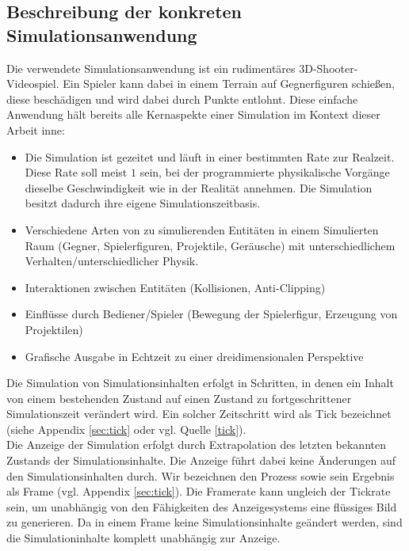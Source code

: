 \subsection{Beschreibung der konkreten Simulationsanwendung}
Die verwendete Simulationsanwendung ist ein rudimentäres 3D-Shooter-Videospiel. Ein Spieler kann dabei in einem Terrain auf Gegnerfiguren schießen, diese beschädigen und wird dabei durch Punkte entlohnt. Diese einfache Anwendung hält bereits alle Kernaspekte einer Simulation im Kontext dieser Arbeit inne:
\begin{itemize}
\item Die Simulation ist gezeitet und läuft in einer bestimmten Rate zur Realzeit. Diese Rate soll meist $1$ sein, bei der programmierte physikalische Vorgänge dieselbe Geschwindigkeit wie in der Realität annehmen. Die Simulation besitzt dadurch ihre eigene Simulationszeitbasis.
\item Verschiedene Arten von zu simulierenden Entitäten in einem Simulierten Raum (Gegner, Spielerfiguren, Projektile, Geräusche) mit unterschiedlichem Verhalten/unterschiedlicher Physik.
\item Interaktionen zwischen Entitäten (Kollisionen, Anti-Clipping)
\item Einflüsse durch Bediener/Spieler (Bewegung der Spielerfigur, Erzeugung von Projektilen)
\item Grafische Ausgabe in Echtzeit zu einer dreidimensionalen Perspektive
\end{itemize}

Die Simulation von Simulationsinhalten erfolgt in Schritten, in denen ein Inhalt von einem bestehenden Zustand auf einen Zustand zu fortgeschrittener Simulationszeit verändert wird. Ein solcher Zeitschritt wird als Tick bezeichnet (siehe Appendix \ref{sec:tick} oder vgl. Quelle \ref{tick}).\\
Die Anzeige der Simulation erfolgt durch Extrapolation des letzten bekannten Zustands der Simulationsinhalte. Die Anzeige führt dabei keine Änderungen auf den Simulationsinhalten durch. Wir bezeichnen den Prozess sowie sein Ergebnis als Frame (vgl. Appendix \ref{sec:tick}).
Die Framerate kann ungleich der Tickrate sein, um unabhängig von den Fähigkeiten des Anzeigesystems eine flüssiges Bild zu generieren. Da in einem Frame keine Simulationsinhalte geändert werden, sind die Simulationinhalte komplett unabhängig zur Anzeige.\\

